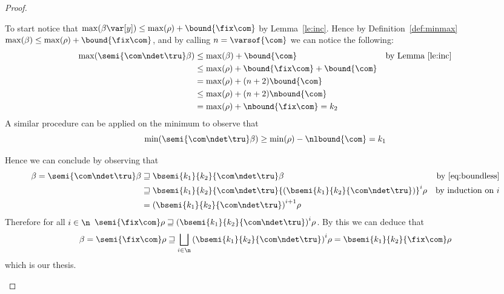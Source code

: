 \begin{proof}
\begin{inductive}
\begin{description}
      To start notice that
      \(\max(\beta\var[y]) \leq \max(\rho) + \bound{\fix\com}\) by
      Lemma~\ref{le:inc}. Hence by Definition~\ref{def:minmax}
      \(\max(\beta) \leq \max(\rho) + \bound{\fix\com}\), and by
      calling \(n = \varsof{\com}\) we can notice the following:
      \begin{align*}
        \max(\semi{\com\ndet\tru}\beta) & \leq \max(\beta) + \bound{\com} & \text{by Lemma~\ref{le:inc}}\\
                                               & \leq \max(\rho) + \bound{\fix\com} + \bound{\com} \\
                                               & = \max(\rho) + (n+2)\bound{\com} \\
                                               & \leq \max(\rho) + (n+2)\nbound{\com} \\
                                               & = \max(\rho) + \nbound{\fix\com} = k_2
      \end{align*}
      A similar procedure can be applied on the minimum to observe
      that
      \[\min(\semi{\com\ndet\tru}\beta) \geq \min(\rho) -
        \nlbound{\com}= k_1\]

      Hence we can conclude by observing that
      \begin{align*}
        \beta = \semi{\com\ndet\tru}\beta & \sqsupseteq \bsemi{k_1}{k_2}{\com\ndet\tru}\beta  & \text{by~\eqref{eq:boundless}}\\
                                                 & \sqsupseteq \bsemi{k_1}{k_2}{\com\ndet\tru}{\left(\bsemi{k_1}{k_2}{\com\ndet\tru}\right)}^i\rho & \text{by induction on } i \\
        & = {\left(\bsemi{k_1}{k_2}{\com\ndet\tru}\right)}^{i+1}\rho
      \end{align*}
      Therefore for all \(i\in\n\)
      \(\semi{\fix\com}\rho \sqsupseteq
      {\left(\bsemi{k_1}{k_2}{\com\ndet\tru}\right)}^{i}\rho\). By
      this we can deduce that
      \begin{equation*}
        \beta = \semi{\fix\com}\rho \sqsupseteq \bigsqcup_{i\in\n}{\left(\bsemi{k_1}{k_2}{\com\ndet\tru}\right)}^i\rho = \bsemi{k_1}{k_2}{\fix\com}\rho
      \end{equation*}
      which is our thesis.
    \end{description}
  \end{inductive}
\end{proof}


